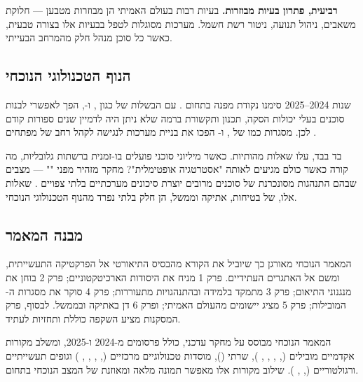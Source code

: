 \documentclass[12pt,a4paper]{article}
\begin{document}
\textbf{רביעית, פתרון בעיות מבוזרות.} בעיות רבות בעולם האמיתי הן מבוזרות מטבען --- חלוקת משאבים, ניהול תנועה, ניטור רשת חשמל. מערכות  מסוגלות לטפל בבעיות אלו בצורה טבעית, כאשר כל סוכן מנהל חלק מהמרחב הבעייתי.

\subsection{הנוף הטכנולוגי הנוכחי}

שנות 2024--2025 סימנו נקודת מפנה בתחום . עם הבשלות של  כגון ,  ו-, הפך לאפשרי לבנות סוכנים בעלי יכולות הסקה, תכנון ותקשורת ברמה שלא ניתן היה לדמיין שנים ספורות קודם לכן. מסגרות כמו  של ,  ו- הפכו את בניית מערכות  לנגישה לקהל רחב של מפתחים \cite{arXiv2411}.

בד בבד, עלו שאלות מהותיות. כאשר מיליוני סוכני  פועלים בו-זמנית ברשתות גלובליות, מה קורה כאשר כולם מגיעים לאותה "אסטרטגיה אופטימלית"? מחקר  מזהיר מפני "" --- מצבים שבהם התנהגות מסונכרנת של סוכנים מרובים יוצרת סיכונים מערכתיים בלתי צפויים \cite{MIT_Media2025}. שאלות אלו, של בטיחות, אתיקה וממשל, הן חלק בלתי נפרד מהנוף הטכנולוגי הנוכחי.

\subsection{מבנה המאמר}

המאמר הנוכחי מאורגן כך שיוביל את הקורא מהבסיס התיאורטי אל הפרקטיקה התעשייתית, ומשם אל האתגרים העתידיים. פרק 1 מניח את היסודות הארכיטקטוניים; פרק 2 בוחן את מנגנוני התיאום; פרק 3 מתמקד בלמידה ובהתנהגויות מתעוררות; פרק 4 סוקר את מסגרות ה- המובילות; פרק 5 מציג יישומים מהעולם האמיתי; ופרק 6 דן באתיקה ובממשל. לבסוף, פרק המסקנות מציע השקפה כוללת ותחזיות לעתיד.

המאמר הנוכחי מבוסס על מחקר עדכני, כולל פרסומים מ-2024 ו-2025, ומשלב מקורות אקדמיים מובילים (, , , , ), שרתי  (), מוסדות טכנולוגיים מרכזיים (, , , , ) וגופים תעשייתיים ורגולטוריים (, , ). שילוב מקורות אלו מאפשר תמונה מלאה ומאוזנת של המצב הנוכחי בתחום.

\newpage

\end{document}
